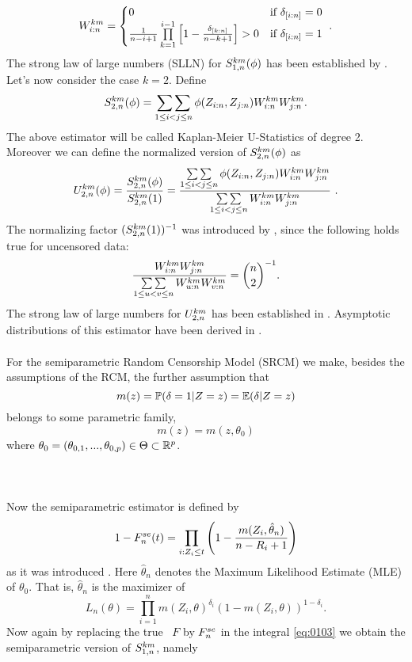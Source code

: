 \[ W_{i:n}^{km} = \begin{cases} 
0 & \textrm{if } \delta_{[i:n]} = 0 \\
\frac{1}{n-i+1}\prod\limits_{k=1}^{i-1}\left[1-\frac{\delta_{[k:n]}}{n-k+1}\right] > 0 & \textrm{if } \delta_{[i:n]} = 1
\end{cases}\textrm{ .}
\]
%
The strong law of large numbers (SLLN) for $S_{1,n}^{km}(\phi)$ has been established by \citet{stute1993strong}.
%
Let's now consider the case $k=2$. Define
\begin{equation*}
S_{2,n}^{km}(\phi) = \mathop{\sum\sum}\limits_{1\leq i < j \leq n} \phi(Z_{i:n}, Z_{j:n}) W_{i:n}^{km} W_{j:n}^{km}.
\end{equation*}
The above estimator will be called Kaplan-Meier U-Statistics of degree 2. Moreover we can define the normalized version of $S_{2,n}^{km}(\phi)$ as
$$U_{2,n}^{km}(\phi) = \frac{S_{2,n}^{km}(\phi)}{S_{2,n}^{km}(1)} = \frac{\mathop{\sum\sum}\limits_{1\leq i < j \leq n} \phi(Z_{i:n}, Z_{j:n}) W_{i:n}^{km} W_{j:n}^{km}}{\mathop{\sum\sum}\limits_{1\leq i < j \leq n} W_{i:n}^{km} W_{j:n}^{km}}\textrm{ .}$$ 
The normalizing factor $(S_{2,n}^{km}(1))^{-1}$ was introduced by \cite{bose1999strong}, since the following holds true for uncensored data:
$$\frac{W_{i:n}^{km}W_{j:n}^{km}}{\mathop{\sum\sum}\limits_{1\leq u < v \leq n}W_{u:n}^{km}W_{v:n}^{km}} = \binom{n}{2}^{-1}\textrm{.}$$ 
The strong law of large numbers for $U_{2,n}^{km}$ has been established in \citet{bose1999strong}. Asymptotic distributions of this estimator have been derived in \citet{bose2002asymptotic}. \\
\\
For the semiparametric Random Censorship Model (SRCM) we make, besides the assumptions of the RCM, the further assumption that 
$$m(z) = \mathbb{P}(\delta=1|Z=z) = \mathbb{E}(\delta|Z=z)$$
belongs to some parametric family, \ie\
$$m(z) = m(z,\theta_0)$$
where $\theta_0=(\theta_{0,1},...,\theta_{0,p})\in \Theta \subset \mathbb{R}^p$. \\
\\
 \cite{dikta1998semiparametric}\\
\\
Now the semiparametric estimator is defined by
$$1-F_n^{se}(t) = \prod\limits_{i:Z_i\leq t}\left(1-\frac{m(Z_i,\hat{\theta}_n)}{n-R_i+1}\right)$$
as it was introduced \citet{dikta2000strong}. Here $\hat{\theta}_n$ denotes the Maximum Likelihood Estimate (MLE) of $\theta_0$. That is, $\hat{\theta}_n$ is the maximizer of 
$$L_n(\theta)=\prod\limits_{i=1}^{n} m(Z_i,\theta)^{\delta_i}(1-m(Z_i,\theta))^{1-\delta_i}.$$
Now again by replacing the true \df\ $F$ by $F_n^{se}$ in the integral \eqref{eq:0103} we obtain the semiparametric version of $S_{1,n}^{km}$, namely
